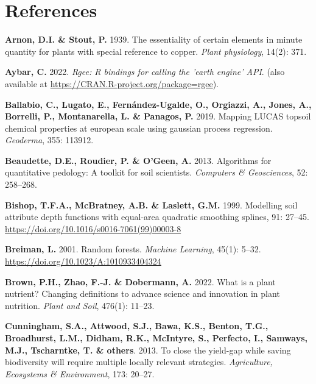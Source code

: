 \documentclass[
  10pt,
  b5paper,
  oneside]{book}
\newlength{\cslhangindent}
\newlength{\cslentryspacingunit} %
\newenvironment{CSLReferences}[2] %
 {%
  \setlength{\parindent}{0pt}
  \ifodd #1
  \let\oldpar\par
  \def\par{\hangindent=\cslhangindent\oldpar}
  \fi
  \setlength{\parskip}{#2\cslentryspacingunit}
 }%
 {}
\begin{document}
\hypertarget{references}{%
\chapter*{References}\label{references}}

\hypertarget{refs}{}
\begin{CSLReferences}{0}{0}
\leavevmode{}%
\textbf{Arnon, D.I. \& Stout, P.} 1939. The essentiality of certain elements in minute quantity for plants with special reference to copper. \emph{Plant physiology}, 14(2): 371.

\leavevmode{}%
\textbf{Aybar, C.} 2022. \emph{Rgee: R bindings for calling the 'earth engine' API}. (also available at \url{https://CRAN.R-project.org/package=rgee}).

\leavevmode{}%
\textbf{Ballabio, C., Lugato, E., Fernández-Ugalde, O., Orgiazzi, A., Jones, A., Borrelli, P., Montanarella, L. \& Panagos, P.} 2019. Mapping LUCAS topsoil chemical properties at european scale using gaussian process regression. \emph{Geoderma}, 355: 113912.

\leavevmode{}%
\textbf{Beaudette, D.E., Roudier, P. \& O'Geen, A.} 2013. Algorithms for quantitative pedology: A toolkit for soil scientists. \emph{Computers \& Geosciences}, 52: 258--268.

\leavevmode{}%
\textbf{Bishop, T.F.A., McBratney, A.B. \& Laslett, G.M.} 1999. Modelling soil attribute depth functions with equal-area quadratic smoothing splines, 91: 27--45. \url{https://doi.org/10.1016/s0016-7061(99)00003-8}

\leavevmode{}%
\textbf{Breiman, L.} 2001. Random forests. \emph{Machine Learning}, 45(1): 5--32. \url{https://doi.org/10.1023/A:1010933404324}

\leavevmode{}%
\textbf{Brown, P.H., Zhao, F.-J. \& Dobermann, A.} 2022. What is a plant nutrient? Changing definitions to advance science and innovation in plant nutrition. \emph{Plant and Soil}, 476(1): 11--23.

\leavevmode{}%
\textbf{Cunningham, S.A., Attwood, S.J., Bawa, K.S., Benton, T.G., Broadhurst, L.M., Didham, R.K., McIntyre, S., Perfecto, I., Samways, M.J., Tscharntke, T. \& others}. 2013. To close the yield-gap while saving biodiversity will require multiple locally relevant strategies. \emph{Agriculture, Ecosystems \& Environment}, 173: 20--27.


\end{CSLReferences}
\end{document}
